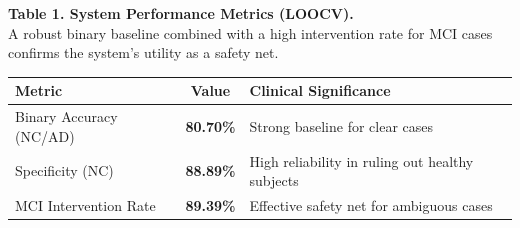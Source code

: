 \documentclass[border=5pt]{standalone}
\begin{document}
\begin{minipage}{14cm}
  \centering
  
  \small 
  \textbf{Table 1. System Performance Metrics (LOOCV).} \\
  A robust binary baseline combined with a high intervention rate for MCI cases confirms the system's utility as a safety net.
  
  \vspace{4pt} 

  \renewcommand{\arraystretch}{1.3} 
  \begin{tabularx}{\linewidth}{l c X}
    \toprule
    \textbf{Metric} & \textbf{Value} & \textbf{Clinical Significance} \\
    \midrule
    Binary Accuracy (NC/AD) & \textbf{80.70\%} & Strong baseline for clear cases \\
    Specificity (NC) & \textbf{88.89\%} & High reliability in ruling out healthy subjects \\ 
    MCI Intervention Rate & \textbf{89.39\%} & Effective safety net for ambiguous cases \\
    \bottomrule
  \end{tabularx}

\end{minipage}
\end{document}
